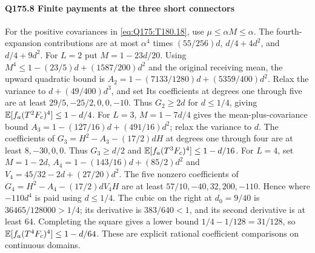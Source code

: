 \paragraph{Q175.8 Finite payments at the three short connectors}\label{part:Q175.8}
For the positive covariances in \eqref{eq:Q175:T180.18}, use
$\mu\le\allowbreak \alpha M\le\allowbreak \alpha$. The fourth-expansion contributions are at
most $\alpha^4$ times $(55/256)d$, $d/4+4d^2$, and $d/4+9d^2$.
For $L=\allowbreak 2$ put $M=\allowbreak 1-23d/20$.
Using $M^4\le\allowbreak 1-(23/5)d+(1587/200)d^2$ and the original receiving
mean, the upward quadratic bound is
$A_2=\allowbreak 1-(7133/1280)d+(5359/400)d^2$.
Relax the variance to $d+(49/400)d^3$, and set
Its coefficients at degrees one through five are at least
$29/5,\allowbreak -25/2,\allowbreak 0,\allowbreak 0,\allowbreak -10$. Thus $G_2\ge\allowbreak 2d$ for $d\le\allowbreak 1/4$, giving
$\mathbb E[f_a(T^2F_c)^4]\le\allowbreak 1-d/4$.
For $L=\allowbreak 3$, $M=\allowbreak 1-7d/4$ gives the mean-plus-covariance bound
$A_3=\allowbreak 1-(127/16)d+(491/16)d^2$; relax the variance to $d$.
The coefficients of $G_3=\allowbreak H^2-A_3-(17/2)dH$ at degrees one through
four are at least $8,\allowbreak -30,\allowbreak 0,\allowbreak 0$.
Thus $G_3\ge\allowbreak  d/2$ and $\mathbb E[f_a(T^3F_c)^4]\le\allowbreak 1-d/16$.
For $L=\allowbreak 4$, set $M=\allowbreak 1-2d$,
$A_4=\allowbreak 1-(143/16)d+(85/2)d^2$ and
$V_4=\allowbreak 45/32-2d+(27/20)d^2$.
The five nonzero coefficients of $G_4=\allowbreak H^2-A_4-(17/2)dV_4H$ are at
least $57/10,\allowbreak -40,\allowbreak 32,\allowbreak 200,\allowbreak -110$. Hence
where $-110d^4$ is paid using $d\le\allowbreak 1/4$.
The cubic on the right at $d_0=\allowbreak 9/40$ is $36465/128000>\allowbreak 1/4$;
its derivative is $383/640<\allowbreak 1$, and its second derivative is at least $64$.
Completing the square gives a lower bound
$1/4-1/128=\allowbreak 31/128$, so $\mathbb E[f_a(T^4F_c)^4]\le\allowbreak 1-d/64$.
These are explicit rational coefficient comparisons on continuous domains.

